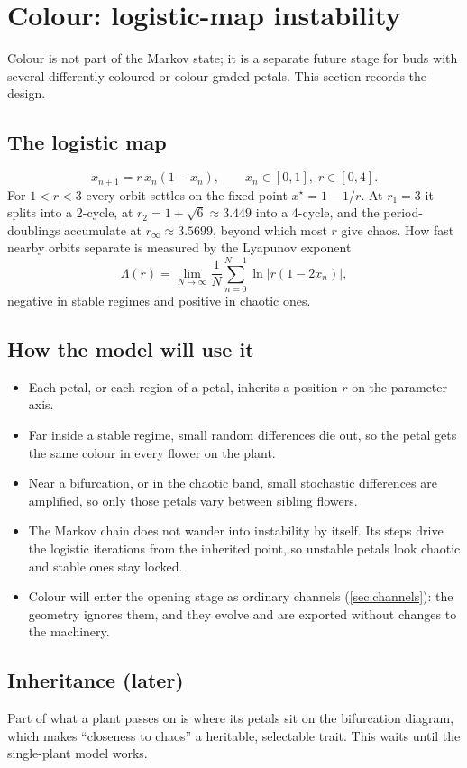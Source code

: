\section{Colour: logistic-map instability}\label{sec:colour}

Colour is not part of the Markov state; it is a separate future stage for buds
with several differently coloured or colour-graded petals. This section
records the design.

\subsection{The logistic map}
\[
  x_{n+1} = r\,x_n(1 - x_n), \qquad x_n\in[0,1],\; r\in[0,4].
\]
For $1 < r < 3$ every orbit settles on the fixed point $x^\star = 1 - 1/r$. At
$r_1 = 3$ it splits into a 2-cycle, at $r_2 = 1+\sqrt6 \approx 3.449$ into a
4-cycle, and the period-doublings accumulate at $r_\infty\approx 3.5699$, beyond
which most $r$ give chaos. How fast nearby orbits separate is measured by the
Lyapunov exponent
\[
  \Lambda(r) = \lim_{N\to\infty}\frac1N\sum_{n=0}^{N-1}\ln\lvert r(1 - 2x_n)\rvert,
\]
negative in stable regimes and positive in chaotic ones.

\subsection{How the model will use it}
\begin{itemize}[leftmargin=*]
\item Each petal, or each region of a petal, inherits a position $r$ on the
  parameter axis.
\item Far inside a stable regime, small random differences die out, so the
  petal gets the same colour in every flower on the plant.
\item Near a bifurcation, or in the chaotic band, small stochastic differences
  are amplified, so only those petals vary between sibling flowers.
\item The Markov chain does not wander into instability by itself. Its steps
  drive the logistic iterations from the inherited point, so unstable petals
  look chaotic and stable ones stay locked.
\item Colour will enter the opening stage as ordinary channels
  (\cref{sec:channels}): the geometry ignores them, and they evolve and are
  exported without changes to the machinery.
\end{itemize}

\subsection{Inheritance (later)}
Part of what a plant passes on is where its petals sit on the bifurcation
diagram, which makes ``closeness to chaos'' a heritable, selectable trait. This
waits until the single-plant model works.
